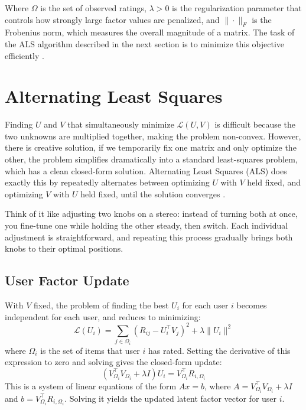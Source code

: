 \documentclass[12pt,a4paper]{report}
\begin{document}
Where \( \Omega \) is the set of observed ratings, \( \lambda > 0 \) is the regularization parameter that controls how strongly large factor values are penalized, and \( \| \cdot \|_F \) is the Frobenius norm, which measures the overall magnitude of a matrix. The task of the ALS algorithm described in the next section is to minimize this objective efficiently \parencite{koren2009matrix}.

\section{Alternating Least Squares}

Finding \( U \) and \( V \) that simultaneously minimize \( \mathcal{L}(U, V) \) is difficult because the two unknowns are multiplied together, making the problem non-convex. However, there is creative solution, if we temporarily fix one matrix and only optimize the other, the problem simplifies dramatically into a standard least-squares problem, which has a clean closed-form solution. Alternating Least Squares (ALS) does exactly this by repeatedly alternates between optimizing \( U \) with \( V \) held fixed, and optimizing \( V \) with \( U \) held fixed, until the solution converges \parencite{zhou2008large}.

Think of it like adjusting two knobs on a stereo: instead of turning both at once, you fine-tune one while holding the other steady, then switch. Each individual adjustment is straightforward, and repeating this process gradually brings both knobs to their optimal positions.

\subsection*{User Factor Update}

With \( V \) fixed, the problem of finding the best \( U_i \) for each user \( i \) becomes independent for each user, and reduces to minimizing:
\[
    \mathcal{L}(U_i) = \sum_{j \in \Omega_i} \left( R_{ij} - U_i^\top V_j \right)^2
    + \lambda \|U_i\|^2
\]
where \( \Omega_i \) is the set of items that user \( i \) has rated. Setting the derivative of this expression to zero and solving gives the closed-form update:
\[
    \left( V_{\Omega_i}^\top V_{\Omega_i} + \lambda I \right) U_i =
    V_{\Omega_i}^\top R_{i,\Omega_i}
\]
This is a system of linear equations of the form \( Ax = b \), where \( A = V_{\Omega_i}^\top V_{\Omega_i} + \lambda I \) and \( b = V_{\Omega_i}^\top R_{i,\Omega_i} \). Solving it yields the updated latent factor vector for user \( i \).
\end{document}
